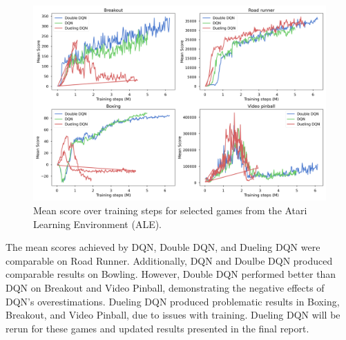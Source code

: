 \documentclass{article}
\begin{document}
\begin{figure}[ht]
    \centering
    \includegraphics[width=\linewidth]{double_dqn-mean_scores.png}
    \caption{Mean score over training steps for selected games from the Atari
    Learning Environment (ALE).}
    \label{fig:training}
\end{figure}

The mean scores achieved by DQN, Double DQN, and Dueling DQN were comparable on Road Runner. 
Additionally, DQN and Doulbe DQN produced comparable results on Bowling. However, Double DQN 
performed better than DQN on Breakout and Video Pinball, demonstrating the negative effects 
of DQN's overestimations. Dueling DQN produced problematic results in Boxing, Breakout, and
Video Pinball, due to issues with training. Dueling DQN will be rerun for these games and
updated results presented in the final report.


\end{document}
